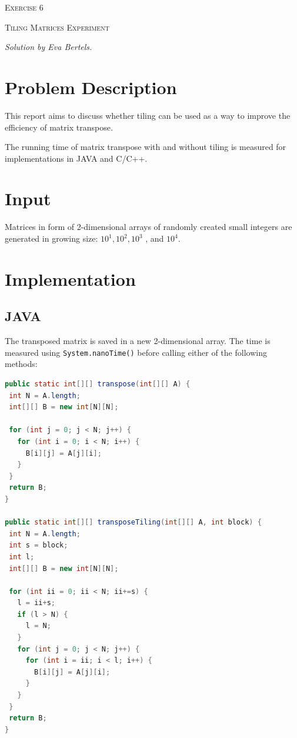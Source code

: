 \documentclass[
    12pt,
    a4paper,
    oneside, 
    headinclude,footinclude,
    BCOR5mm,
]{scrartcl}
\begin{document}
\begin{centering}
    {\scshape \LARGE Exercise 6 \par}
    {\scshape Tiling Matrices Experiment \par}
    {\itshape \small Solution by Eva Bertels. \par}
\end{centering}

\section*{Problem Description}
This report aims to discuss whether tiling can be used as a way to improve the efficiency of matrix transpose.

The running time of matrix transpose with and without tiling is measured for implementations in JAVA and C/C++. 

\section*{Input}
Matrices in form of 2-dimensional arrays of randomly created small integers are generated in growing size: $10^{1}, 10^{2}, 10^{3}$ , and $10^{4}$.


\section*{Implementation}

\subsection*{JAVA}
The transposed matrix is saved in a new 2-dimensional array.
The time is measured using \texttt{System.nanoTime()} before calling either of the following methods:

\begin{lstlisting}[language=JAVA, caption=Transpose methods in JAVA]
public static int[][] transpose(int[][] A) {
 int N = A.length;
 int[][] B = new int[N][N];

 for (int j = 0; j < N; j++) {
   for (int i = 0; i < N; i++) {
     B[i][j] = A[j][i];
   }
 }
 return B;
}

public static int[][] transposeTiling(int[][] A, int block) {
 int N = A.length;
 int s = block;
 int l;
 int[][] B = new int[N][N];

 for (int ii = 0; ii < N; ii+=s) {
   l = ii+s;
   if (l > N) {
     l = N;
   }
   for (int j = 0; j < N; j++) {
     for (int i = ii; i < l; i++) {
       B[i][j] = A[j][i];
     }
   }
 }
 return B;
}
\end{lstlisting}
\end{document}
